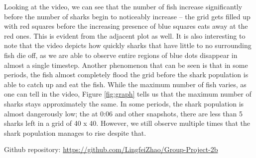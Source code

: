 \documentclass{article}
\begin{document}
Looking at the video, we can see that the number of fish increase significantly before the number of sharks begin to noticeably increase -- the grid gets filled up with red squares before the increasing presence of blue squares eats away at the red ones. This is evident from the adjacent plot as well. It is also interesting to note that the video depicts how quickly sharks that have little to no surrounding fish die off, as we are able to observe entire regions of blue dots disappear in almost a single timestep. Another phenomenon that can be seen is that in some periods, the fish almost completely flood the grid before the shark population is able to catch up and eat the fish. While the maximum number of fish varies, as one can tell in the video, Figure \ref{fig:graph} tells us that the maximum number of sharks stays approximately the same. In some periods, the shark population is almost dangerously low; the at 0:06 and other snapshots, there are less than 5 sharks left in a grid of
40 x 40. However, we still observe multiple times that the shark population manages to rise despite that.\par
\bigskip
\noindent Github repository: \url{https://github.com/LingfeiZhao/Group-Project-2b}
\end{document}
